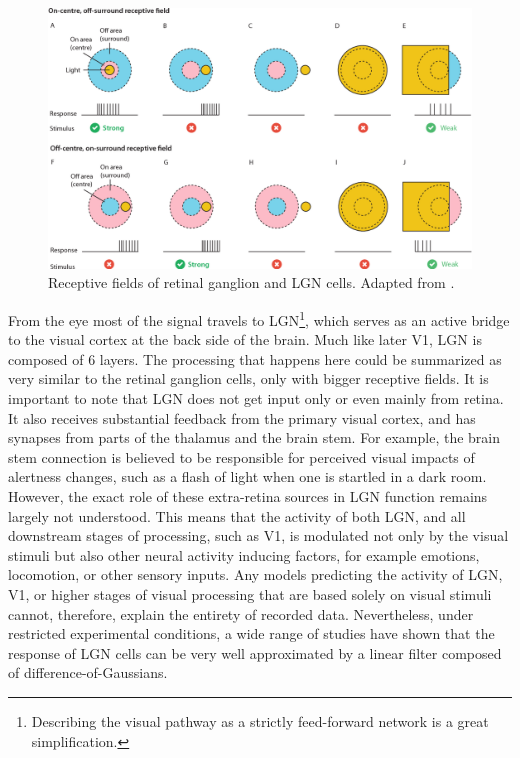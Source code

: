 \begin{figure}
    \centering
    \includegraphics[width=1\textwidth]{../figures/01_33-Figure2.8-1}
    \caption[Receptive fields of retinal ganglion and LGN cells]{Receptive fields of retinal ganglion and LGN cells. Adapted from \cite{thesis_2015}.}
    \label{fig:1.1}
\end{figure}

From the eye most of the signal travels to LGN\footnote{Describing the visual pathway as a strictly feed-forward network is a great simplification.}, which serves as an active bridge to the visual cortex at the back side of the brain. Much like later V1, LGN is composed of 6 layers. The processing that happens here could be summarized as very similar to the retinal ganglion cells, only with bigger receptive fields. It is important to note that LGN does not get input only or even mainly from retina. It also receives substantial feedback from the primary visual cortex, and has synapses from parts of the thalamus and the brain stem. For example, the brain stem connection is believed to be responsible for perceived visual impacts of alertness changes, such as a flash of light when one is startled in a dark room. However, the exact role of these extra-retina sources in LGN function remains largely not understood. This means that the activity of both LGN, and all downstream stages of processing, such as V1, is modulated not only by the visual stimuli but also other neural activity inducing factors, for example emotions, locomotion, or other sensory inputs. Any models predicting the activity of LGN, V1, or higher stages of visual processing that are based solely on visual stimuli cannot, therefore, explain the entirety of recorded data. Nevertheless, under restricted experimental conditions, a wide range of studies have shown that the response of LGN cells can be very well approximated by a linear filter composed of difference-of-Gaussians. 

